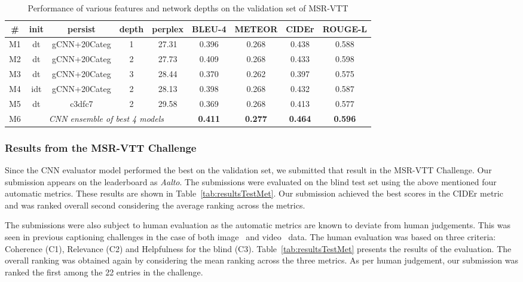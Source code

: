 \begin{table}[thp]
  \centering
  \begin{adjustbox}{center}
  \newcommand{\bs}{\small\bf}
  \begin{tabular}{||c|c|c|c|c|c|c|c|c|}
    \hline\hline
    \bf\# &\bf init &\bf persist &\bf depth &\bf perplex &\bs BLEU-4 &\bs METEOR &\bs CIDEr &\bs ROUGE-L \\\hline\hline
    M1 & dt  & gCNN+20Categ & 1  & 27.31 & 0.396 & 0.268 & 0.438 & 0.588 \\
    M2 & dt  & gCNN+20Categ & 2  & 27.73 & 0.409 & 0.268 & 0.433 & 0.598 \\
    M3 & dt  & gCNN+20Categ & 3  & 28.44 & 0.370 & 0.262 & 0.397 & 0.575 \\\hline
    M4 & idt & gCNN+20Categ & 2  & 28.13 & 0.398 & 0.268 & 0.432 & 0.587 \\
    M5 & dt  & c3dfc7       & 2  & 29.58 & 0.369 & 0.268 & 0.413 & 0.577 \\\hline
    M6 & \multicolumn{4}{c|}{\em CNN ensemble of best 4 models}
                                  & \bf0.411 & \bf0.277 & \bf0.464 & \bf0.596 \\\hline
    \hline
  \end{tabular}
  \end{adjustbox}
  \caption{Performance of various features and 
    network depths on the validation set of MSR-VTT}
  \label{tab:resVttFeat}
\end{table}


\subsubsection{Results from the MSR-VTT Challenge}

Since the CNN evaluator model performed the best on the validation set, we
submitted that result in the MSR-VTT Challenge.
Our submission appears on the leaderboard as \emph{Aalto}.
The submissions were evaluated on the blind test set using the above mentioned
four automatic metrics.
These results are shown in Table~\ref{tab:resultsTestMet}.
Our submission achieved the best scores in the CIDEr metric and was ranked
overall second considering the average ranking across the metrics.

The submissions were also subject to human evaluation as the automatic metrics
are known to deviate from human judgements.
This was seen in previous captioning challenges in the case of both
image~\cite{CocoChallengeSlides} and
video~\cite{DBLP:journals/corr/RohrbachTRTPLCS16} data.
The human evaluation was based on three criteria: Coherence (C1), Relevance (C2)
and Helpfulness for the blind (C3).
Table~\ref{tab:resultsTestMet} presents the results of the evaluation.
The overall ranking was obtained again by considering the mean ranking across
the three metrics.
As per human judgement, our submission was ranked the first among the 22 entries
in the challenge.

